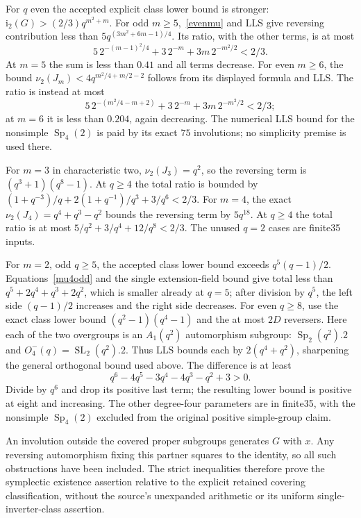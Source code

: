 \documentclass[10pt]{article}
\newcommand{\ii}{\mathrm i_2}\newcommand{\nuu}{\nu_2}\newcommand{\F}{\mathbb F}\newcommand{\GL}{\operatorname{GL}}\newcommand{\GU}{\operatorname{GU}}\newcommand{\Sp}{\operatorname{Sp}}\newcommand{\PSp}{\operatorname{PSp}}\newcommand{\PGSp}{\operatorname{PGSp}}\newcommand{\Aut}{\operatorname{Aut}}
\begin{document}
For $q$ even the accepted explicit class lower bound is stronger:
$\ii(G)>(2/3)q^{m^2+m}$. For odd $m\ge5$,~\eqref{evenmu} and LLS give
reversing contribution less than $5q^{(3m^2+6m-1)/4}$. Its ratio, with the
other terms, is at most
\[
 5\,2^{-(m-1)^2/4}+3\,2^{-m}+3m\,2^{-m^2/2}<2/3.
\]
At $m=5$ the sum is less than $0.41$ and all terms decrease. For even
$m\ge6$, the bound $\nuu(J_m)<4q^{m^2/4+m/2-2}$ follows from its displayed
formula and LLS. The ratio is instead at most
\[
 5\,2^{-(m^2/4-m+2)}+3\,2^{-m}+3m\,2^{-m^2/2}<2/3;
\]
at $m=6$ it is less than $0.204$, again decreasing. The numerical LLS
bound for the nonsimple $\Sp_4(2)$ is paid by its exact $75$ involutions;
no simplicity premise is used there.

For $m=3$ in characteristic two, $\nuu(J_3)=q^2$, so the reversing term
is $(q^3+1)(q^8-1)$. At $q\ge4$ the total ratio is bounded by
$(1+q^{-3})/q+2(1+q^{-1})/q^3+3/q^6<2/3$.
For $m=4$, the exact $\nuu(J_4)=q^4+q^3-q^2$ bounds the reversing term
by $5q^{18}$. At $q\ge4$ the total ratio is at most
$5/q^2+3/q^4+12/q^8<2/3$. The unused $q=2$ cases are finite35 inputs.

For $m=2$, odd $q\ge5$, the accepted class lower bound exceeds
$q^5(q-1)/2$. Equations~\eqref{mu4odd} and the single extension-field
bound give total less than
$q^5+2q^4+q^3+2q^2$, which is smaller already at $q=5$; after division by
$q^5$, the left side $(q-1)/2$ increases and the right side decreases.
For even $q\ge8$, use the exact class lower bound
$(q^2-1)(q^4-1)$ and the at most $2D$ reversers. Here each of the two
overgroups is an $A_1(q^2)$ automorphism subgroup:
$\Sp_2(q^2).2$ and $O^-_4(q)=\operatorname{SL}_2(q^2).2$.
Thus LLS bounds each by $2(q^4+q^2)$, sharpening the general orthogonal
bound used above. The difference is at least
\[
 q^6-4q^5-3q^4-4q^3-q^2+3>0.
\]
Divide by $q^6$ and drop its positive last term; the resulting lower bound
is positive at eight and increasing. The other degree-four parameters are
in finite35, with the nonsimple $\Sp_4(2)$ excluded from the original
positive simple-group claim.

An involution outside the covered proper subgroups generates $G$ with $x$.
Any reversing automorphism fixing this partner squares to the identity,
so all such obstructions have been included. The strict inequalities
therefore prove the symplectic existence assertion relative to the
explicit retained covering classification, without the source's unexpanded arithmetic
or its uniform single-inverter-class assertion.
\end{document}
